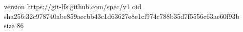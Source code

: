 version https://git-lfs.github.com/spec/v1
oid sha256:32c978740abe859aecbb43c1d63627e8e1cf974c788b35d7f5556c63ae60f93b
size 86
